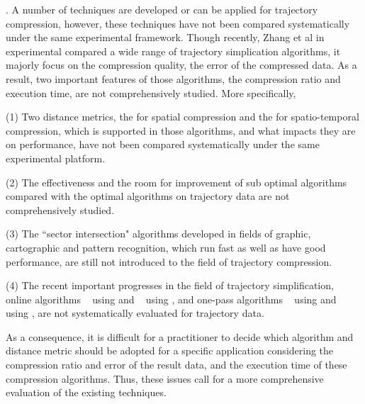 . A number of techniques are developed or can be applied for trajectory compression, however, these techniques have not been compared systematically under the same experimental framework.
Though recently, Zhang et al in \cite{Zhang:Evaluation} experimental compared a wide range of trajectory simplication algorithms, it majorly focus on the compression quality, \ie the error of the compressed data. As a result, two important features of those algorithms, the compression ratio and execution time, are not comprehensively studied. 
More specifically, 

\ni (1) Two distance metrics, \ie the \ped for spatial compression and the \sed \cite{Meratnia:Spatiotemporal} for spatio-temporal compression, which is supported in those algorithms, and what impacts they are on performance, have not been compared systematically under the same experimental platform. 

\ni (2) The effectiveness and the room for improvement of sub optimal \lsa algorithms compared with the optimal \lsa algorithms on trajectory data are not comprehensively studied.

\ni (3) The ``sector intersection" algorithms \cite{Williams:Longest, Sklansky:Cone, Dunham:Cone, Zhao:Sleeve} developed in fields of graphic, cartographic and pattern recognition, which run fast as well as have good performance, are still not introduced to the field of trajectory compression.

\ni (4) The recent important progresses in the field of trajectory simplification, \ie online algorithms \squishe~\cite{Muckell:Compression} using \sed and \bqsa~\cite{Liu:BQS} using \ped, and one-pass algorithms \operb~\cite{Lin:Operb} using \ped and \cised~\cite{Lin:Cised} using \sed, are not systematically evaluated for trajectory data. 


As a consequence, it is difficult for a practitioner to decide which algorithm and distance metric should be adopted for a specific application considering the compression ratio and error of the result data, and the execution time of these compression algorithms.
% 
Thus, these issues call for a more comprehensive evaluation of the existing \lsa techniques. %


